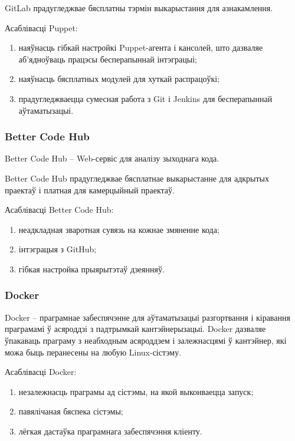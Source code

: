 GitLab прадугледжвае бясплатны тэрмін выкарыстання для азнакамлення.

Асаблівасці Puppet:
\begin{enumerate}
    \item наяўнасць гібкай настройкі Puppet-агента і кансолей, што
          дазваляе аб'ядноўваць працэсы бесперапыннай інтэграцыі;
    \item наяўнасць бясплатных модулей для хуткай распрацоўкі;
    \item прадугледжваецца сумесная работа з Git і Jenkins для
          бесперапыннай аўтаматызацыі.
\end{enumerate}

\subsubsection{Better Code Hub}

Better Code Hub -- Web-сервіс для аналізу зыходнага кода.

Better Code Hub прадугледжвае бясплатнае выкарыстанне
для адкрытых праектаў і платная для камерцыйный праектаў.

Асаблівасці Better Code Hub:
\begin{enumerate}
    \item неадкладная зваротная сувязь на кожнае змяненне кода;
    \item інтэграцыя з GitHub;
    \item гібкая настройка прыярытэтаў дзеянняў.
\end{enumerate}

\subsubsection{Docker}

Docker -- праграмнае забеспячэнне для аўтаматызацыі разгортвання і
кіравання праграмамі ў асяроддзі з падтрымкай кантэйнерызацыі.
Docker дазваляе ўпакаваць праграму з неабходным асяроддзем і
залежнасцямі ў кантэйнер, які можа быць перанесены на любую
Linux-сістэму.

Асаблівасці Docker:
\begin{enumerate}
    \item незалежнасць праграмы ад сістэмы, на якой выконваецца
          запуск;
    \item павялічаная бяспека сістэмы;
    \item лёгкая дастаўка праграмнага забеспячэння кліенту.
\end{enumerate}

